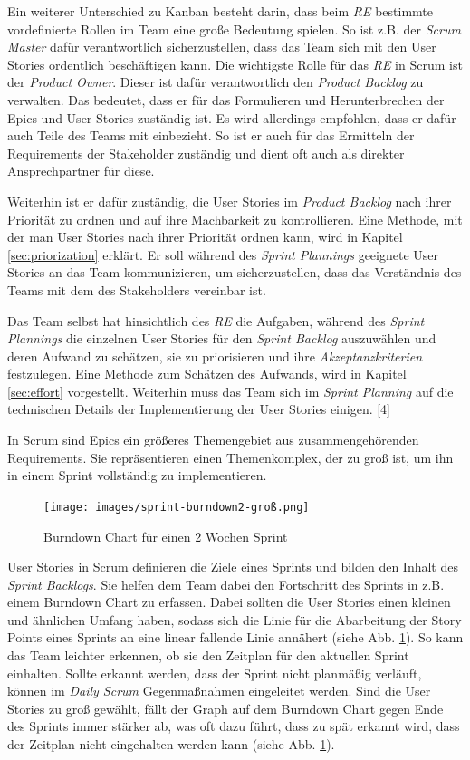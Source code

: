 \documentclass[acmtog]{acmart}
\begin{document}
Ein weiterer Unterschied zu Kanban besteht darin, dass beim \emph{RE} bestimmte vordefinierte Rollen im Team eine
große Bedeutung spielen. So ist z.B. der \emph{Scrum Master} dafür verantwortlich sicherzustellen, dass das Team sich mit den
User Stories ordentlich beschäftigen kann. Die wichtigste Rolle für das \emph{RE} in Scrum ist der \emph{Product Owner}. Dieser ist
dafür verantwortlich den \emph{Product Backlog} zu verwalten. Das bedeutet, dass er für das Formulieren und Herunterbrechen der
Epics und User Stories zuständig ist. Es wird allerdings empfohlen, dass er dafür auch Teile des Teams mit einbezieht. So ist er auch für
das Ermitteln der Requirements der Stakeholder zuständig und dient oft auch als direkter Ansprechpartner für diese. \cite{reinscrum}

Weiterhin ist er dafür zuständig, die User Stories im \emph{Product Backlog} nach ihrer Priorität zu ordnen und auf ihre Machbarkeit
zu kontrollieren. Eine Methode, mit der man User Stories nach ihrer Priorität ordnen kann, wird in Kapitel \ref{sec:priorization} erklärt.
Er soll während des \emph{Sprint Plannings} geeignete User Stories an das Team kommunizieren, um sicherzustellen, dass das Verständnis
des Teams mit dem des Stakeholders vereinbar ist. \cite{reinscrum}

Das Team selbst hat hinsichtlich des \emph{RE} die Aufgaben, während des \emph{Sprint Plannings} die einzelnen User Stories für den \emph{Sprint
	Backlog} auszuwählen und deren Aufwand zu schätzen, sie zu priorisieren und ihre \emph{Akzeptanzkriterien} festzulegen. Eine Methode zum Schätzen des Aufwands, wird in Kapitel \ref{sec:effort} vorgestellt.
Weiterhin muss das Team sich im \emph{Sprint Planning} auf die technischen Details der Implementierung der User Stories einigen. [4]

In Scrum sind Epics ein größeres Themengebiet aus zusammengehörenden Requirements. Sie repräsentieren einen Themenkomplex, der
zu groß ist, um ihn in einem Sprint vollständig zu implementieren. \cite{reinscrum}

\begin{figure}[t]
	\centering
	\texttt{[image: images/sprint-burndown2-groß.png]}
	\caption{Burndown Chart für einen 2 Wochen Sprint}
	\label{fig:burndownchart}
	\Description{}
\end{figure}

User Stories in Scrum definieren die Ziele eines Sprints und bilden den Inhalt des \emph{Sprint Backlogs}. Sie helfen dem Team dabei den Fortschritt
des Sprints in z.B. einem Burndown Chart zu erfassen. Dabei sollten die User Stories einen kleinen und ähnlichen Umfang haben, sodass
sich die Linie für die Abarbeitung der Story Points eines Sprints an eine linear fallende Linie annähert (siehe Abb. \ref{fig:burndownchart}). So kann das
Team leichter erkennen, ob sie den Zeitplan für den aktuellen Sprint einhalten. Sollte erkannt werden, dass der Sprint nicht planmäßig verläuft, können im
\emph{Daily Scrum} Gegenmaßnahmen eingeleitet werden. Sind die User Stories zu groß gewählt, fällt der
Graph auf dem Burndown Chart gegen Ende des Sprints immer stärker ab, was oft dazu führt, dass zu spät erkannt wird, dass der Zeitplan
nicht eingehalten werden kann (siehe Abb. \ref{fig:burndownchart}). \cite{reinscrum}
\end{document}
